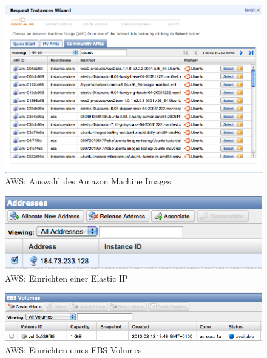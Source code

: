 \begin{figure}[H] 
  \begin{center}
    \includegraphics[width=\textwidth]{grafik/aws-select-AMI} 
  \end{center}
  \caption{AWS: Auswahl des Amazon Machine Images}
  \label{fig:aws-ami}
\end{figure}

\begin{figure}[H] 
  \begin{center}
    \includegraphics[width=\textwidth]{grafik/aws-ip} 
  \end{center}
  \caption{AWS: Einrichten einer Elastic IP}
  \label{fig:aws-ip}
\end{figure}

\begin{figure}[H] 
  \begin{center}
    \includegraphics[width=\textwidth]{grafik/aws-ebs-volume} 
  \end{center}
  \caption{AWS: Einrichten eines EBS Volumes}
  \label{fig:aws-ebs}
\end{figure}


